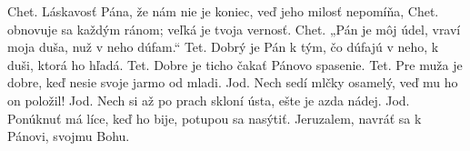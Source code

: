 Chet.
Láskavosť Pána, že nám nie je koniec,
veď jeho milosť nepomíňa,
\versseparator
Chet.
obnovuje sa každým ránom;
veľká je tvoja vernosť.
\versseparator
Chet.
„Pán je môj údel, vraví moja duša,
nuž v neho dúfam.“
\versseparator
Tet.
Dobrý je Pán k tým, čo dúfajú v neho,
k duši, ktorá ho hľadá.
\versseparator
Tet.
Dobre je ticho čakať
Pánovo spasenie.
\versseparator
Tet.
Pre muža je dobre, keď nesie
svoje jarmo od mladi.
\versseparator
Jod.
Nech sedí mlčky osamelý,
veď mu ho on položil!
\versseparator
Jod.
Nech si až po prach skloní ústa,
ešte je azda nádej.
\versseparator
Jod.
Ponúknuť má líce, keď ho bije,
potupou sa nasýtiť.
\versseparator
Jeruzalem, navráť sa k Pánovi, svojmu Bohu.